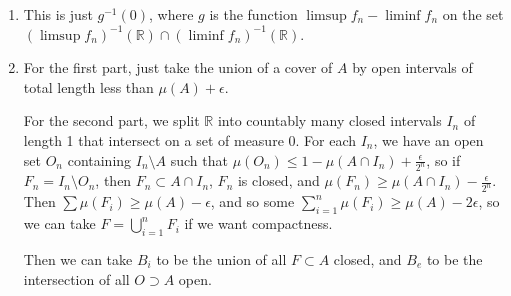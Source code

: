\documentclass{article}
\newcommand\RR{\mathbb R}
\begin{document}
\begin{enumerate}
  \item This is just $g^{-1}(0)$, where $g$ is the function $\limsup f_n - \liminf f_n$ on the set $(\limsup f_n)^{-1}(\RR) \cap (\liminf f_n)^{-1}(\RR)$.
  
  \item For the first part, just take the union of a cover of $A$ by open intervals of total length less than $\mu(A) + \epsilon$.
  
  For the second part, we split $\RR$ into countably many closed intervals $I_n$ of length 1 that intersect on a set of measure 0. For each $I_n$, we have an open set $O_n$ containing $I_n \setminus A$ such that $\mu(O_n) \leq 1 - \mu(A \cap I_n) + \frac\epsilon{2^n}$, so if $F_n = I_n \setminus O_n$, then $F_n \subset A \cap I_n$, $F_n$ is closed, and $\mu(F_n) \geq \mu(A \cap I_n) - \frac\epsilon{2^n}$. Then $\sum \mu(F_i) \geq \mu(A) - \epsilon$, and so some $\sum_{i=1}^n \mu(F_i) \geq \mu(A) - 2\epsilon$, so we can take $F = \bigcup_{i=1}^n F_i$ if we want compactness.
  
  Then we can take $B_i$ to be the union of all $F \subset A$ closed, and $B_e$ to be the intersection of all $O \supset A$ open.

\end{enumerate}
\end{document}
